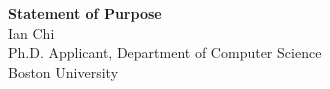 \documentclass[11pt]{article}
\begin{document}
\begin{center}
    {\Large \textbf{Statement of Purpose}}\\[4pt]
    {\large Ian Chi}\\[2pt]
    Ph.D. Applicant, Department of Computer Science\\
    Boston University
\end{center}

\vspace{1em}

\end{document}
